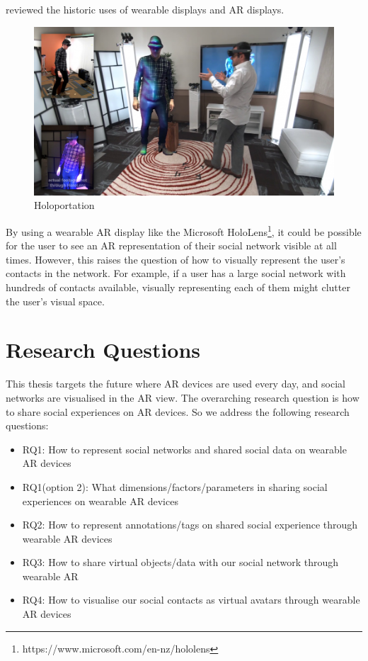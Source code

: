 \cite{Peddie2017} reviewed the historic uses of wearable displays and AR displays. 

\begin{figure}
    \centering
    \includegraphics[width=.8\linewidth]{images/holoportation.png}
    \caption{Holoportation}
    \label{fig:holoportation}
\end{figure}

By using a wearable AR display like the Microsoft HoloLens\footnote{https://www.microsoft.com/en-nz/hololens}, it could be possible for the user to see an AR representation of their social network visible at all times. However, this raises the question of how to visually represent the user's contacts in the network. For example, if a user has a large social network with hundreds of contacts available, visually representing each of them might clutter the user's visual space.

\section{Research Questions}

This thesis targets the future where AR devices are used every day, and social networks are visualised in the AR view. The overarching research question is how to share social experiences on AR devices. So we address the following research questions: 

\begin{itemize}
    \item RQ1: How to represent social networks and shared social data on wearable AR devices 
    
    \item RQ1(option 2): What dimensions/factors/parameters in sharing social experiences on wearable AR devices 
    
    \item RQ2: How to represent annotations/tags on shared social experience through wearable AR devices
    
    \item RQ3: How to share virtual objects/data with our social network through wearable AR 
    
    \item RQ4: How to visualise our social contacts as virtual avatars through wearable AR devices

\end{itemize}

